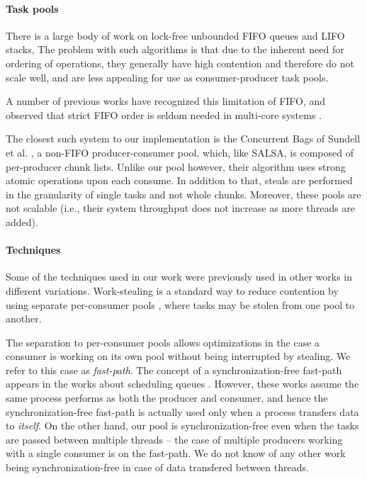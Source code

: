 \paragraph{Task pools\\}
There is a large body of work on lock-free unbounded FIFO queues and LIFO
stacks\cite{Gidenstam:2010:CLQ:1940234.1940266,Hendler:2004:SLS:1007912.1007944,
Hoffman:2007:BQ:1782394.1782423, Michael:1996:SFP:248052.248106,Moir:2005:UEI:1073970.1074013},
The problem with such algorithms is that due to the inherent need for ordering of operations, they
generally have high contention and therefore do not scale well, and are less appealing for use as 
consumer-producer task pools. 

A number of previous works have recognized this limitation of FIFO, and observed that strict FIFO
order is seldom needed in multi-core systems
\cite{Afek:2010:SPP:1885276.1885295,springerlink:10.1007/978-3-642-17653-1_29,
Basin:2011:CST:2075029.2075087,Sundell:2011:LAC:1989493.1989550}. 

The closest such system to our implementation is the Concurrent Bags of Sundell et al.
\cite{Sundell:2011:LAC:1989493.1989550}, a non-FIFO producer-consumer pool, which, like SALSA, is
composed of per-producer chunk lists. Unlike our pool however, their algorithm uses strong
atomic operations upon each consume. In addition to that, steals are performed in the granularity
of single tasks and not whole chunks. Moreover, these pools are not scalable (i.e., their system
throughput does not increase as more threads are added).

\paragraph{Techniques\\}
Some of the techniques used in our work were previously used in other works in different
variations. Work-stealing is a standard way to reduce contention by using separate per-consumer
pools \cite{Blumofe:1999:SMC:324133.324234}, where tasks may be stolen from one pool to another.

The separation to per-consumer pools allows optimizations in the case a consumer is working on its
own pool without being interrupted by stealing. We refer to this case as \emph{fast-path}.
The concept of a synchronization-free fast-path appears in the works about scheduling queues
\cite{Arora:1998:TSM:277651.277678}. However, these works assume the same process performs as both
the producer and consumer, and hence the synchronization-free fast-path is actually used only when a
process transfers data to \emph{itself}. On the other hand, our pool is synchronization-free even
when the tasks are passed between multiple threads -- the case of multiple producers working with a
single consumer is on the fast-path. We do not know of any other work being synchronization-free in
case of data transfered between threads.

